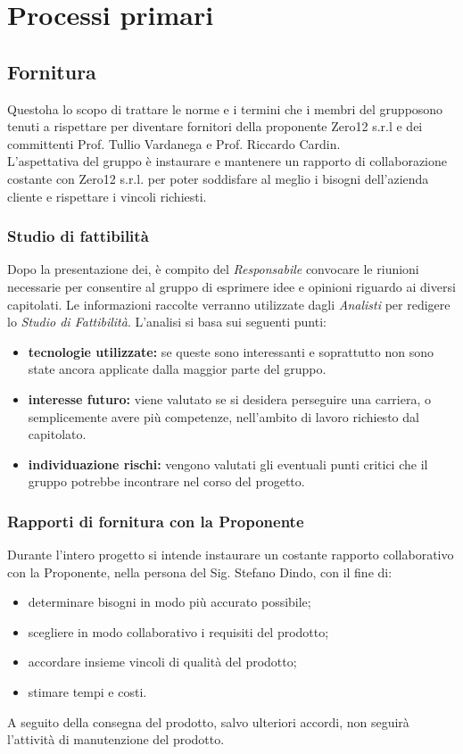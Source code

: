 \chapter{Processi primari}
\section{Fornitura}			
Questoha lo scopo di trattare le norme e i termini che i membri del grupposono tenuti a rispettare per diventare fornitori della proponente Zero12 s.r.l e dei committenti Prof. Tullio Vardanega e Prof. Riccardo Cardin. \\
L'aspettativa del gruppo è instaurare e mantenere un rapporto di collaborazione costante con Zero12 s.r.l. per poter soddisfare al meglio i bisogni dell'azienda cliente e rispettare i vincoli richiesti.
\subsection{Studio di fattibilità} 
Dopo la presentazione dei, è compito del \textit{Responsabile} convocare le riunioni necessarie per consentire al gruppo di esprimere idee e opinioni riguardo ai diversi capitolati. Le informazioni raccolte verranno utilizzate dagli \textit{Analisti} per redigere lo \textit{Studio di Fattibilità}. L'analisi si basa sui seguenti punti:
\begin{itemize}
	\item \textbf{tecnologie utilizzate:} se queste sono interessanti e soprattutto non sono state ancora applicate dalla maggior parte del gruppo.
	\item \textbf{interesse futuro:} viene valutato se si desidera perseguire una carriera, o semplicemente avere più competenze, nell'ambito di lavoro richiesto dal capitolato.
	\item \textbf{individuazione rischi:} vengono valutati gli eventuali punti critici che il gruppo potrebbe incontrare nel corso del progetto.
\end{itemize}
\subsection{Rapporti di fornitura con la Proponente}
Durante l'intero progetto si intende instaurare un costante rapporto collaborativo con la Proponente, nella persona del Sig. Stefano Dindo, con il fine di:
\begin{itemize}
	\item determinare bisogni in modo più accurato possibile;
	\item scegliere in modo collaborativo i requisiti del prodotto;
	\item accordare insieme vincoli di qualità del prodotto;
	\item stimare tempi e costi.
\end{itemize}
A seguito della consegna del prodotto, salvo ulteriori accordi, non seguirà l'attività di manutenzione del prodotto.
